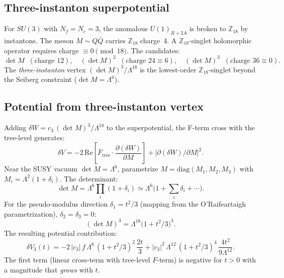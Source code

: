 \subsection{Three-instanton superpotential}

For $SU(3)$ with $N_f = N_c = 3$, the anomalous $U(1)_{R+2A}$ is broken to
$\mathbb{Z}_{18}$ by instantons. The meson $M \sim Q\bar Q$ carries $\mathbb{Z}_{18}$
charge~4. A $\mathbb{Z}_{18}$-singlet holomorphic operator requires charge
$\equiv 0\pmod{18}$. The candidates:
\begin{equation}
\det M \;\;(\text{charge 12}), \quad
(\det M)^2 \;\;(\text{charge 24} \equiv 6), \quad
(\det M)^3 \;\;(\text{charge 36} \equiv 0).
\end{equation}
The \emph{three-instanton} vertex $(\det M)^3/\Lambda^{18}$ is the lowest-order
$\mathbb{Z}_{18}$-singlet beyond the Seiberg constraint ($\det M = \Lambda^6$).

\subsection{Potential from three-instanton vertex}

Adding $\delta W = c_3\,(\det M)^3/\Lambda^{18}$ to the superpotential,
the F-term cross with the tree-level generates:
\begin{equation}
\delta V = -2\,\text{Re}\!\left[\bar F_{\text{tree}}\cdot
\frac{\partial(\delta W)}{\partial M}\right] + |\partial(\delta W)/\partial M|^2.
\end{equation}
Near the SUSY vacuum $\det M = \Lambda^6$, parametrize
$M = \text{diag}(M_1, M_2, M_3)$ with $M_i = \Lambda^2(1 + \delta_i)$.
The determinant:
\begin{equation}
\det M = \Lambda^6\prod_i(1+\delta_i)
\simeq \Lambda^6\bigl(1 + \sum_i\delta_i + \cdots\bigr).
\end{equation}
For the pseudo-modulus direction $\delta_1 = t^2/3$ (mapping from the O'Raifeartaigh
parametrization), $\delta_2 = \delta_3 = 0$:
\begin{equation}
(\det M)^3 = \Lambda^{18}\bigl(1 + t^2/3\bigr)^3.
\end{equation}
The resulting potential contribution:
\begin{equation}
\delta V_3(t) = -2\,|c_3|\,f\,\Lambda^6\,(1+t^2/3)^2\,\frac{2t}{3}
+ |c_3|^2\,\Lambda^{12}\,(1+t^2/3)^4\,\frac{4t^2}{9\Lambda^{12}}.
\end{equation}
The first term (linear cross-term with tree-level $F$-term) is negative for $t > 0$
with a magnitude that \emph{grows} with $t$.

